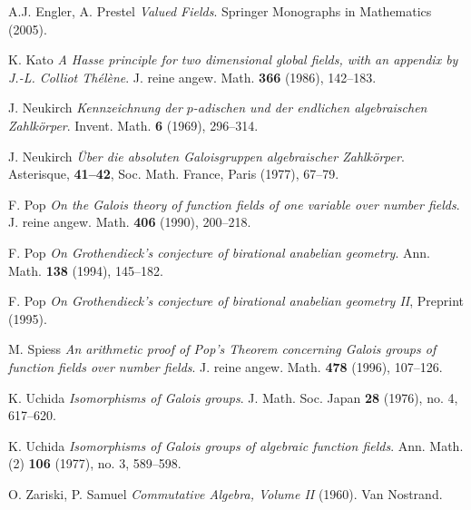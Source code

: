 \begin{thebibliography}{999999}

    A.J. Engler, A. Prestel
    \textit{Valued Fields}.
    Springer Monographs in Mathematics (2005).

    K. Kato
    \textit{A Hasse principle for two dimensional global fields, with an appendix by J.-L. Colliot Thélène}.
    J. reine angew. Math. \textbf{366} (1986), 142\---183.
       
    J. Neukirch
    \textit{Kennzeichnung der $p$-adischen und der endlichen algebraischen Zahlkörper}.
    Invent. Math. \textbf{6} (1969), 296\---314.
    
    J. Neukirch
    \textit{Über die absoluten Galoisgruppen algebraischer Zahlkörper}. Asterisque, \textbf{41\---42}, Soc. Math. France, Paris (1977), 67\---79.
    
    F. Pop
    \textit{On the Galois theory of function fields of one variable over number fields}.
    J. reine angew. Math. \textbf{406} (1990), 200\---218.

    F. Pop
    \textit{On Grothendieck's conjecture of birational anabelian geometry}.
    Ann. Math. \textbf{138} (1994), 145\---182.

    F. Pop
    \textit{On Grothendieck's conjecture of birational anabelian geometry II}, Preprint (1995).
    
	M. Spiess
	\textit{An arithmetic proof of Pop's Theorem concerning Galois groups of function fields over number fields}.
    J. reine angew. Math. \textbf{478} (1996), 107\---126.
   
    K. Uchida
    \textit{Isomorphisms of Galois groups}.
    J. Math. Soc. Japan \textbf{28} (1976), no. 4, 617\---620.

    K. Uchida
    \textit{Isomorphisms of Galois groups of algebraic function fields}.
    Ann. Math. (2) \textbf{106} (1977), no. 3, 589\---598.
  
    O. Zariski, P. Samuel
    \textit{Commutative Algebra, Volume II} (1960). 
    Van Nostrand. 

\end{thebibliography}
